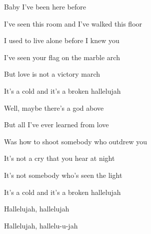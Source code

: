 \begin{song}
\Chorus

\bigskip

Baby I've been here before \par
I've seen this room and I've walked this floor \par
I used to live alone before I knew you  \par
I've seen your flag on the marble arch \par
But love is not a victory march \par
It's a cold and it's a broken hallelujah \par

\bigskip

\Chorus

\bigskip

Well, maybe there's a god above \par
But all I've ever learned from love \par
Was how to shoot somebody who outdrew you  \par
It's not a cry that you hear at night \par
It's not somebody who's seen the light \par
It's a cold and it's a broken hallelujah \par

\bigskip

Hallelujah, hallelujah \par
Hallelujah, hallelu-u-jah \par

\end{song}